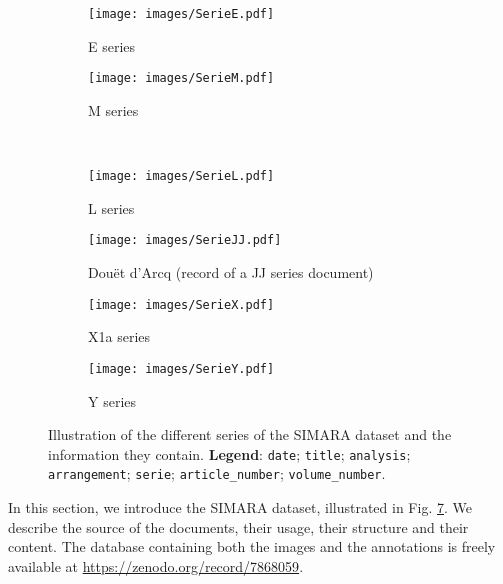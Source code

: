 \documentclass[runningheads]{llncs}
\newcommand{\cbox}[1]{\colorbox{#1}{\phantom{0}}}
\begin{document}
\begin{figure}
     \centering
     \begin{subfigure}[b]{0.49\textwidth}
         \texttt{[image: images/SerieE.pdf]}
         \caption{E series}
         \label{fig:serie_e}
     \end{subfigure}     
     \begin{subfigure}[b]{0.49\textwidth}
         \texttt{[image: images/SerieM.pdf]}
         \caption{M series}
         \label{fig:serie_m}
     \end{subfigure}\vspace{1em}\\\vspace{1em}
     \hfill
     \begin{subfigure}[b]{0.49\textwidth}
         \texttt{[image: images/SerieL.pdf]}
         \caption{L series}
         \label{fig:serie_l}
     \end{subfigure}
     \begin{subfigure}[b]{0.49\textwidth}
         \texttt{[image: images/SerieJJ.pdf]}
         \caption{Douët d'Arcq (record of a JJ series document)}
         \label{fig:serie_m}
     \end{subfigure}\vspace{1em}
     \hfill
     \begin{subfigure}[b]{0.49\textwidth}
         \texttt{[image: images/SerieX.pdf]}
         \caption{X1a series}
         \label{fig:serie_x}
     \end{subfigure}
     \begin{subfigure}[b]{0.49\textwidth}
         \centering
         \texttt{[image: images/SerieY.pdf]}
         \caption{Y series}
         \label{fig:serie_y}
     \end{subfigure}
     \hfill
        \caption{Illustration of the different series of the SIMARA dataset and the information they contain. \textbf{Legend}: \cbox{blue} \texttt{date};  \cbox{yellow} \texttt{title};  \cbox{pink} \texttt{analysis}; \cbox{teal} \texttt{arrangement}; \cbox{purple} \texttt{serie}; \cbox{green} \texttt{article\_number}; \cbox{orange} \texttt{volume\_number}.}
        \label{fig:simara_datset}
\end{figure} 

In this section, we introduce the SIMARA dataset, illustrated in Fig. \ref{fig:simara_datset}. We describe the source of the documents, their usage, their structure and their content. The database containing both the images and the annotations is freely available at \url{https://zenodo.org/record/7868059}.
\end{document}
